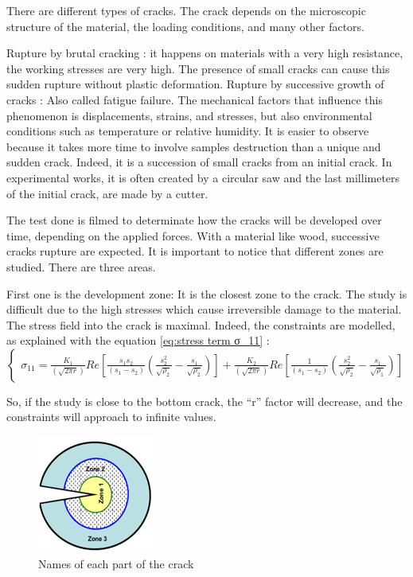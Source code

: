 There are different types of cracks. The crack depends on the microscopic structure of the material, the loading conditions, and many other factors.

Rupture by brutal cracking : it happens on materials with a very high resistance, the working stresses are very high. The presence of small cracks can cause this sudden rupture without plastic deformation. 
Rupture by successive growth of cracks : Also called fatigue failure. The mechanical factors that influence this phenomenon is displacements, strains, and stresses, but also environmental conditions such as temperature or relative humidity. It is easier to observe because it takes more time to involve samples destruction than a unique and sudden crack. Indeed, it is a succession of small cracks from an initial crack. In experimental works, it is often created by a circular saw and the last millimeters of the initial crack, are made by a cutter.  

The test done is filmed to determinate how the cracks will be developed over time, depending on the applied forces. With a material like wood, successive cracks rupture are expected. It is important to notice that different zones are studied. There are three areas. 

First one is the development zone: It is the closest zone to the crack. The study is difficult due to the high stresses which cause irreversible damage to the material. The stress field into the crack is maximal. Indeed, the constraints are modelled, as explained with the equation \ref{eq:stress term σ_11} :
\begin{equation}
	\left\{
	\begin{array}{rcr}
		\sigma_{11}=\frac{K_{1}}{(\sqrt{2 \pi r})}Re[\frac{s_{1}s_{2}}{(s_{1}-s_{2})}(\frac{s_{2}^{2}}{\sqrt{\rho_{2}}}-\frac{s_{1}}{\sqrt{\rho_{2}}})]+\frac{K_{2}}{(\sqrt{2 \pi r})}Re[\frac{1}{(s_{1}-s_{2})}(\frac{s_{2}^{2}}{\sqrt{\rho_{2}}}-\frac{s_{1}}{\sqrt{\rho_{1}}})]	
	\end{array}
	\right.
	\label{eq:stress term σ_11}
\end{equation} 

So, if the study is close to the bottom crack, the “r” factor will decrease, and the constraints will approach to infinite values.

\begin{figure}[th]
	\centering
	\includegraphics{Figures/Crack_zones}
	\decoRule
	\caption[Crack zones]{Names of each part of the crack}
	\label{fig:Fig4}
\end{figure}

